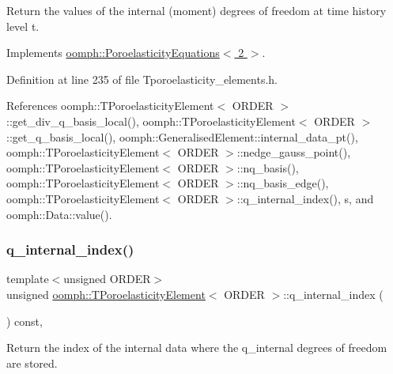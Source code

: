 Return the values of the internal (moment) degrees of freedom at time history level t. 



Implements \hyperlink{classoomph_1_1PoroelasticityEquations_a98223c55e8801bce16d77e4361b2aa64}{oomph\+::\+Poroelasticity\+Equations$<$ 2 $>$}.



Definition at line 235 of file Tporoelasticity\+\_\+elements.\+h.



References oomph\+::\+T\+Poroelasticity\+Element$<$ O\+R\+D\+E\+R $>$\+::get\+\_\+div\+\_\+q\+\_\+basis\+\_\+local(), oomph\+::\+T\+Poroelasticity\+Element$<$ O\+R\+D\+E\+R $>$\+::get\+\_\+q\+\_\+basis\+\_\+local(), oomph\+::\+Generalised\+Element\+::internal\+\_\+data\+\_\+pt(), oomph\+::\+T\+Poroelasticity\+Element$<$ O\+R\+D\+E\+R $>$\+::nedge\+\_\+gauss\+\_\+point(), oomph\+::\+T\+Poroelasticity\+Element$<$ O\+R\+D\+E\+R $>$\+::nq\+\_\+basis(), oomph\+::\+T\+Poroelasticity\+Element$<$ O\+R\+D\+E\+R $>$\+::nq\+\_\+basis\+\_\+edge(), oomph\+::\+T\+Poroelasticity\+Element$<$ O\+R\+D\+E\+R $>$\+::q\+\_\+internal\+\_\+index(), s, and oomph\+::\+Data\+::value().

\mbox{\label{classoomph_1_1TPoroelasticityElement_a48a1a06d3f87bbd923e8222cf8c19e66}} 
\subsubsection{\texorpdfstring{q\+\_\+internal\+\_\+index()}{q\_internal\_index()}}
{\footnotesize\ttfamily template$<$unsigned O\+R\+D\+ER$>$ \\
unsigned \hyperlink{classoomph_1_1TPoroelasticityElement}{oomph\+::\+T\+Poroelasticity\+Element}$<$ O\+R\+D\+ER $>$\+::q\+\_\+internal\+\_\+index (\begin{DoxyParamCaption}{ }\end{DoxyParamCaption}) const\hspace{0.3cm}{\ttfamily [inline]}, {\ttfamily [virtual]}}



Return the index of the internal data where the q\+\_\+internal degrees of freedom are stored. 



